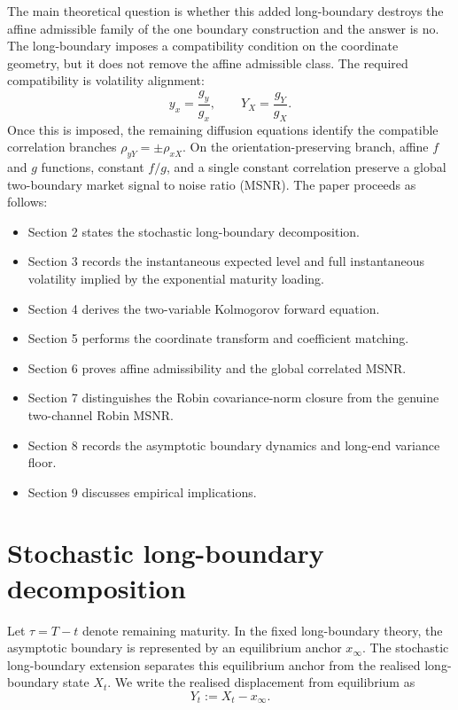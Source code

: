 \documentclass[11pt]{article}
\numberwithin{equation}{section}
\begin{document}
The main theoretical question is whether this added long-boundary destroys the affine admissible family of the one boundary construction and the answer is no. The long-boundary imposes a compatibility condition on the coordinate geometry, but it does not remove the affine admissible class. The required compatibility is volatility alignment:
\begin{equation}
\label{eq:intro-vol-align}
y_x=\frac{g_y}{g_x},
\qquad
Y_X=\frac{g_Y}{g_X}.
\end{equation}
Once this is imposed, the remaining diffusion equations identify the compatible correlation branches \(\rho_{yY}=\pm\rho_{xX}\). On the orientation-preserving branch, affine \(f\) and \(g\) functions, constant \(f/g\), and a single constant correlation preserve a global two-boundary market signal to noise ratio (MSNR).
The paper proceeds as follows:

\begin {itemize}
 \item Section 2 states the stochastic long-boundary decomposition. \item Section 3 records the instantaneous expected level and full instantaneous volatility implied by the exponential maturity loading. \item Section 4 derives the two-variable Kolmogorov forward equation. \item Section 5 performs the coordinate transform and coefficient matching. \item Section 6 proves affine admissibility and the global correlated MSNR. \item Section 7 distinguishes the Robin covariance-norm closure from the genuine two-channel Robin MSNR. \item Section 8 records the asymptotic boundary dynamics and long-end variance floor. \item Section 9 discusses empirical implications.
\end {itemize}


\section{Stochastic long-boundary decomposition}

Let \(\tau=T-t\) denote remaining maturity. In the fixed long-boundary theory, the asymptotic boundary is represented by an equilibrium anchor \(x_\infty\). The stochastic long-boundary extension separates this equilibrium anchor from the realised long-boundary state \(X_t\). We write the realised displacement from equilibrium as
\[
Y_t:=X_t-x_\infty.
\]
\end{document}
